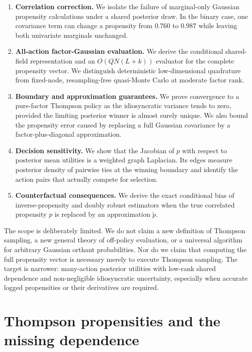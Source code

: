 \documentclass[11pt]{article}
\begin{document}
\begin{enumerate}
\item \textbf{Correlation correction.} We isolate the failure of marginal-only Gaussian propensity calculations under a shared posterior draw. In the binary case, one covariance term can change a propensity from $0.760$ to $0.987$ while leaving both univariate marginals unchanged.

\item \textbf{All-action factor-Gaussian evaluation.} We derive the conditional shared-field representation and an $O(QN(L+k))$ evaluator for the complete propensity vector. We distinguish deterministic low-dimensional quadrature from fixed-node, resampling-free quasi-Monte Carlo at moderate factor rank.

\item \textbf{Boundary and approximation guarantees.} We prove convergence to a pure-factor Thompson policy as the idiosyncratic variance tends to zero, provided the limiting posterior winner is almost surely unique. We also bound the propensity error caused by replacing a full Gaussian covariance by a factor-plus-diagonal approximation.

\item \textbf{Decision sensitivity.} We show that the Jacobian of $p$ with respect to posterior mean utilities is a weighted graph Laplacian. Its edges measure posterior density of pairwise ties at the winning boundary and identify the action pairs that actually compete for selection.

\item \textbf{Counterfactual consequences.} We derive the exact conditional bias of inverse-propensity and doubly robust estimators when the true correlated propensity $p$ is replaced by an approximation $\widetilde p$.
\end{enumerate}

The scope is deliberately limited. We do not claim a new definition of Thompson sampling, a new general theory of off-policy evaluation, or a universal algorithm for arbitrary Gaussian orthant probabilities. Nor do we claim that computing the full propensity vector is necessary merely to execute Thompson sampling. The target is narrower: many-action posterior utilities with low-rank shared dependence and non-negligible idiosyncratic uncertainty, especially when accurate logged propensities or their derivatives are required.

\section{Thompson propensities and the missing dependence}
\label{sec:missing}
\end{document}
